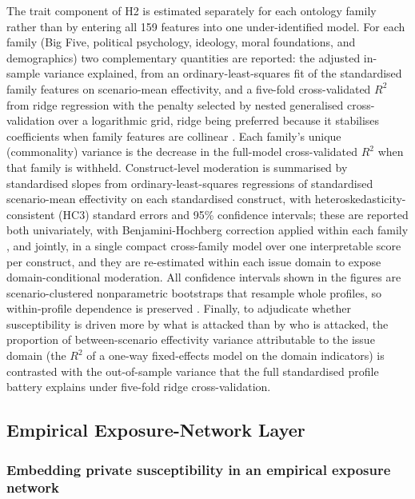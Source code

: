 \documentclass[11pt,a4paper]{article}
\begin{document}
The trait component of H2 is estimated separately for each ontology family rather than by entering
all 159 features into one under-identified model. For each family (Big Five, political psychology,
ideology, moral foundations, and demographics) two complementary quantities are reported: the
adjusted in-sample variance explained, from an ordinary-least-squares fit of the standardised
family features on scenario-mean effectivity, and a five-fold cross-validated $R^2$ from ridge
regression with the penalty selected by nested generalised cross-validation over a logarithmic
grid, ridge being preferred because it stabilises coefficients when family features are collinear
\citep{hoerl1970ridge}. Each family's unique (commonality) variance is the decrease in the
full-model cross-validated $R^2$ when that family is withheld. Construct-level moderation is
summarised by standardised slopes from ordinary-least-squares regressions of standardised
scenario-mean effectivity on each standardised construct, with heteroskedasticity-consistent
(HC3) standard errors and 95\% confidence intervals; these are reported both univariately, with
Benjamini-Hochberg correction applied within each family \citep{benjamini1995controlling}, and
jointly, in a single compact cross-family model over one interpretable score per construct, and
they are re-estimated within each issue domain to expose domain-conditional moderation. All
confidence intervals shown in the figures are scenario-clustered nonparametric bootstraps that
resample whole profiles, so within-profile dependence is preserved \citep{cameron2008bootstrap}.
Finally, to adjudicate whether susceptibility is driven more by what is attacked than by who is
attacked, the proportion of between-scenario effectivity variance attributable to the issue domain
(the $R^2$ of a one-way fixed-effects model on the domain indicators) is contrasted with the
out-of-sample variance that the full standardised profile battery explains under five-fold ridge
cross-validation.

\subsection{Empirical Exposure-Network Layer}\label{sec:network-method}

\subsubsection{Embedding private susceptibility in an empirical exposure network}
\end{document}
